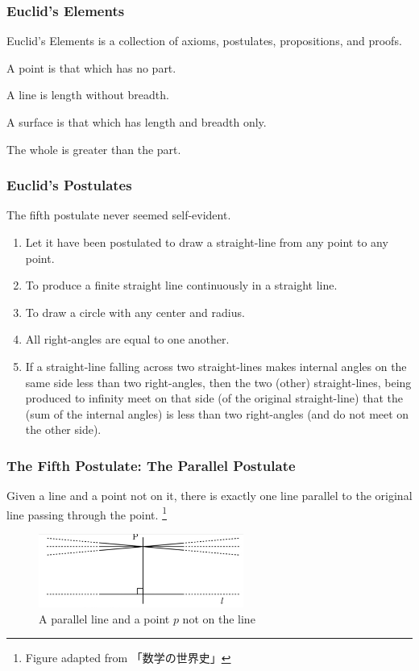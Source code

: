 \documentclass[unicode, 14pt, aspectratio=169]{beamer}
\newcommand\blfootnote[1]{%
  \begingroup
  \renewcommand\thefootnote{}\footnote{#1}%
  \addtocounter{footnote}{-1}%
  \endgroup
}
\begin{document}
\begin{frame}
  \frametitle{Euclid's Elements}
  {\large Euclid's Elements is a collection of axioms, postulates, propositions, and proofs.}
  \par
  \vspace{16pt}
  \begin{description}[leftmargin=0cm]
  \item[Definition 1] A point is that which has no part.
  \item[Definition 2] A line is length without breadth.    
  \item[Definition 3] A surface is that which has length and breadth only.
  \item[Axiom 5] The whole is greater than the part.
  \end{description}
\end{frame}
\begin{frame}
  \frametitle{Euclid's Postulates}
  {\large The fifth postulate never seemed self-evident.}
  \par
  {\footnotesize
  \begin{enumerate}
  \item Let it have been postulated to draw a straight-line from any point to any point.
  \item To produce a finite straight line continuously in a straight line.
  \item To draw a circle with any center and radius.
  \item All right-angles are equal to one another.
  \item If a straight-line falling across two straight-lines makes internal angles on the same side less than two right-angles, then the two (other) straight-lines, being produced to infinity meet on that side (of the original straight-line) that the (sum of the internal angles) is less than two right-angles (and do not meet on the other side).
  \end{enumerate}
  }
\end{frame}
\begin{frame}
  \frametitle{The Fifth Postulate: The Parallel Postulate}
  {\large Given a line and a point not on it, there is exactly one line parallel to the original line passing through the point.}
  \blfootnote{Figure adapted from 「数学の世界史」\supercite{suugaku-no-sekaishi}}
  \begin{figure}
    \includegraphics[width=0.6\textwidth]{images/axiom5.png}
    \caption{A parallel line and a point $p$ not on the line}
  \end{figure}
\end{frame}
\end{document}
